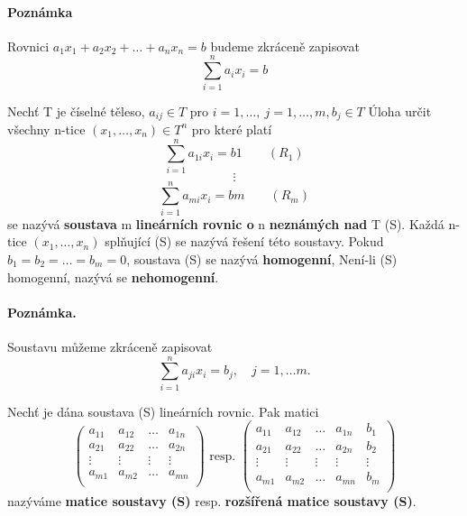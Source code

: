 \paragraph{Poznámka} Rovnici $a_1 x_1 + a_2 x_2 + \dots + a_n x_n = b$ budeme zkráceně zapisovat $$\sum^n_{i=1} a_i x_i = b$$


\begin{definition}
	Nechť T je číselné těleso, $a_{ij} \in T$ pro $i = 1, \dots,\ j = 1, \dots, m, b_j \in T$ Úloha určit všechny n-tice  $(x_1, \dots, x_n) \in T^n$ pro které platí
	$$\sum^n_{i=1} a_{1i}x_i = b1 \qquad (R_1)$$
	$$\vdots$$
	$$\sum^n_{i=1} a_{mi}x_i = bm \qquad (R_m)$$
	se nazývá \textbf{soustava} m \textbf{lineárních rovnic o} n \textbf{neznámých nad} T (S). Každá n-tice $(x_1, \dots, x_n)$ splňující (S) se nazývá řešení této soustavy. Pokud $b_1 = b_2 = \dots = b_m = 0$, soustava (S) se nazývá \textbf{homogenní}, Není-li (S) homogenní, nazývá se \textbf{nehomogenní}.
\end{definition}

\paragraph{Poznámka.} Soustavu můžeme zkráceně zapisovat $$\sum_{i=1}^n a_{ji} x_i = b_j, \quad j = 1, \dots m.$$

\begin{definition}
	Nechť je dána soustava (S) lineárních rovnic. Pak matici 
	\begin{displaymath}
		\left( \begin{array}{cccc}
		a_{11} & a_{12} & \dots & a_{1n} \\
		a_{21} & a_{22} & \dots & a_{2n} \\
		\vdots & \vdots & \vdots &\vdots \\
		a_{m1} & a_{m2} & \dots & a_{mn} \\
		\end{array}\right) \text{ resp. }
		\left( \begin{array}{ccccc}
		a_{11} & a_{12} & \dots & a_{1n} & b_1 \\
		a_{21} & a_{22} & \dots & a_{2n}  & b_2\\
		\vdots & \vdots & \vdots &\vdots  & \vdots\\
		a_{m1} & a_{m2} & \dots & a_{mn} & b_m\\
		\end{array}\right)		
	\end{displaymath}
	nazýváme \textbf{matice soustavy (S)} resp. \textbf{rozšířená matice soustavy (S)}. 
\end{definition}

